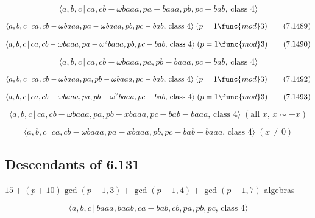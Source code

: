 \documentclass[10pt]{article}
\begin{document}
\begin{equation}
\langle a,b,c\,|\,ca,cb-\omega baaa,pa-baaa,pb,pc-bab,\,\text{class }4\rangle
\tag{7.1488}
\end{equation}

\begin{equation}
\langle a,b,c\,|\,ca,cb-\omega baaa,pa-\omega baaa,pb,pc-bab,\,\text{class }%
4\rangle \;(p=1\func{mod}3)  \tag{7.1489}
\end{equation}

\begin{equation}
\langle a,b,c\,|\,ca,cb-\omega baaa,pa-\omega ^{2}baaa,pb,pc-bab,\,\text{%
class }4\rangle \;(p=1\func{mod}3)  \tag{7.1490}
\end{equation}

\begin{equation}
\langle a,b,c\,|\,ca,cb-\omega baaa,pa,pb-baaa,pc-bab,\,\text{class }4\rangle
\tag{7.1491}
\end{equation}

\begin{equation}
\langle a,b,c\,|\,ca,cb-\omega baaa,pa,pb-\omega baaa,pc-bab,\,\text{class }%
4\rangle \;(p=1\func{mod}3)  \tag{7.1492}
\end{equation}

\begin{equation}
\langle a,b,c\,|\,ca,cb-\omega baaa,pa,pb-\omega ^{2}baaa,pc-bab,\,\text{%
class }4\rangle \;(p=1\func{mod}3)  \tag{7.1493}
\end{equation}

\begin{equation}
\langle a,b,c\,|\,ca,cb-\omega baaa,pa,pb-xbaaa,pc-bab-baaa,\,\text{class }%
4\rangle \;(\text{all }x,\,x\sim -x)  \tag{7.1494}
\end{equation}

\begin{equation}
\langle a,b,c\,|\,ca,cb-\omega baaa,pa-xbaaa,pb,pc-bab-baaa,\,\text{class }%
4\rangle \;(x\neq 0)  \tag{7.1495}
\end{equation}

\subsection{Descendants of 6.131}

$15+(p+10)\gcd (p-1,3)+\gcd (p-1,4)+\gcd (p-1,7)$ algebras

\begin{equation}
\langle a,b,c\,|\,baaa,baab,ca-bab,cb,pa,pb,pc,\,\text{class }4\rangle 
\tag{7.1496}
\end{equation}
\end{document}
